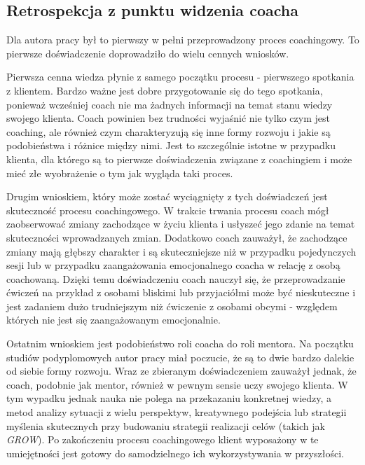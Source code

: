 \subsection{Retrospekcja z punktu widzenia coacha}

Dla autora pracy był to pierwszy w pełni przeprowadzony proces coachingowy. To pierwsze doświadczenie doprowadziło do wielu cennych wniosków.

Pierwsza cenna wiedza płynie z samego początku procesu - pierwszego spotkania z klientem. Bardzo ważne jest dobre przygotowanie się do tego spotkania,
ponieważ wcześniej coach nie ma żadnych informacji na temat stanu wiedzy swojego klienta. Coach powinien bez trudności wyjaśnić nie tylko czym jest coaching,
ale również czym charakteryzują się inne formy rozwoju i jakie są podobieństwa i różnice między nimi. Jest to szczególnie istotne w przypadku
klienta, dla którego są to pierwsze doświadczenia związane z coachingiem i może mieć złe wyobrażenie o tym jak wygląda taki proces.

Drugim wnioskiem, który może zostać wyciągnięty z tych doświadczeń jest skuteczność procesu coachingowego. W trakcie trwania procesu coach mógł zaobserwować
zmiany zachodzące w życiu klienta i usłyszeć jego zdanie na temat skuteczności wprowadzanych zmian. Dodatkowo coach zauważył, że zachodzące zmiany
mają głębszy charakter i są skuteczniejsze niż w przypadku pojedynczych sesji lub w przypadku zaangażowania emocjonalnego coacha w relację z osobą
coachowaną. Dzięki temu doświadczeniu coach nauczył się, że przeprowadzanie ćwiczeń na przykład z osobami bliskimi lub przyjaciółmi może być nieskuteczne
i jest zadaniem dużo trudniejszym niż ćwiczenie z osobami obcymi - względem których nie jest się zaangażowanym emocjonalnie.

Ostatnim wnioskiem jest podobieństwo roli coacha do roli mentora. Na początku studiów podyplomowych autor pracy miał poczucie, że są to dwie bardzo
dalekie od siebie formy rozwoju. Wraz ze zbieranym doświadczeniem zauważył jednak, że coach, podobnie jak mentor, również w pewnym sensie uczy swojego klienta.
W tym wypadku jednak nauka nie polega na przekazaniu konkretnej wiedzy, a metod analizy sytuacji z wielu perspektyw, kreatywnego podejścia lub
strategii myślenia skutecznych przy budowaniu strategii realizacji celów (takich jak \emph{GROW}). Po zakończeniu procesu coachingowego klient wyposażony
w te umiejętności jest gotowy do samodzielnego ich wykorzystywania w przyszłości.
